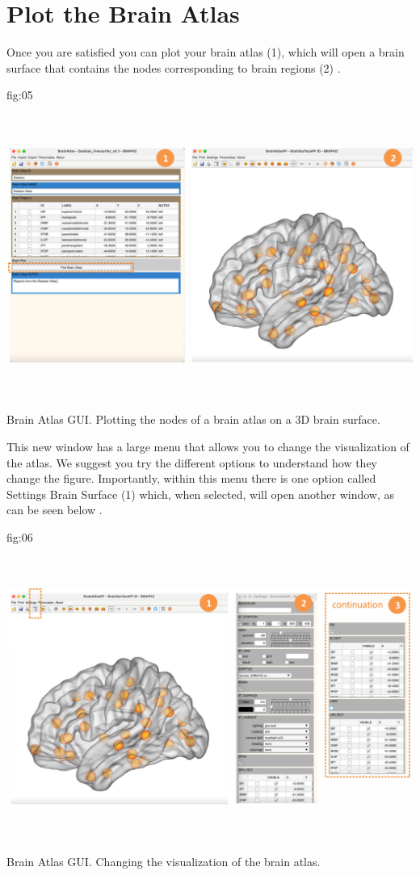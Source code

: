 \documentclass[justified]{tufte-handout}
\begin{document}
\clearpage
\section{Plot the Brain Atlas}

Once you are satisfied you can plot your brain atlas (1), which will open a brain surface that contains the nodes corresponding to brain regions (2) .

	{fig:05}
	{\includegraphics[height=10cm]{tut_ba/fig5.png}}
	{Brain Atlas GUI.}
	{
	Plotting the nodes of a brain atlas on a 3D brain surface. 
	}
	
This new window has a large menu that allows you to change the visualization of the atlas. We suggest you try the different options to understand how they change the figure. Importantly, within this menu there is one option called Settings Brain Surface (1) which, when selected, will open another window, as can be seen below .

	{fig:06}
	{\includegraphics[height=10cm]{tut_ba/fig6.png}}
	{Brain Atlas GUI.}
	{
	Changing the visualization of the brain atlas. 
	}
\end{document}
